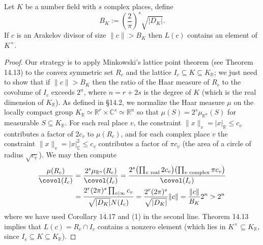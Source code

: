 \begin{proposition}[15.9]
Let $K$ be a number field with $s$ complex places, define
\[
B_K:=\left(\frac2\pi\right)^s\sqrt{|D_K|}.
\]
If $c$ is an Arakelov divisor of size $\|c\|>B_K$ then $L(c)$ contains an element of $K^\times$.
\end{proposition}
\begin{proof}
Our strategy is to apply Minkowski's lattice point theorem (see Theorem 14.13) to the convex symmetric set $R_c$ and the lattice $I_c\subseteq K\subseteq K_{\mathbb R}$; we just need to show that if $\|c\|>B_K$ then the ratio of the Haar measure of $R_c$ to the covolume of $I_c$ exceeds $2^n$, where $n=r+2s$ is the degree of $K$ (which is the real dimension of $K_{\mathbb R}$). As defined in \S14.2, we normalize the Haar measure $\mu$ on the locally compact group $K_{\mathbb R}\simeq\mathbb R^r\times\mathbb C^s\simeq\mathbb R^n$ so that $\mu(S)=2^s\mu_{\mathbb R^n}(S)$ for measurable $S\subseteq K_{\mathbb R}$. For each real place $v$, the constraint $\|x\|_v=|x|_{\mathbb R}\leq c_v$ contributes a factor of $2c_v$ to $\mu(R_c)$, and for each complex place $v$ the constraint $\|x\|_v=|x|_{\mathbb C}^2\leq c_v$ contributes a factor of $\pi c_v$ (the area of a circle of radius $\sqrt{c_v}$). We may then compute
\begin{align*}
\frac{\mu(R_c)}{\covol(I_c)}
&=\frac{2^s\mu_{\mathbb R^n}(R_c)}{\covol(I_c)}
=\frac{2^s\bigl(\prod_{v\text{ real}}2c_v\bigr)\bigl(\prod_{v\text{ complex}}\pi c_v\bigr)}{\covol(I_c)}\\
&=\frac{2^r(2\pi)^s\prod_{v\mid\infty}c_v}{\sqrt{|D_K|}N(I_c)}
=\frac{2^r(2\pi)^s}{\sqrt{|D_K|}}\|c\|
=\frac{\|c\|}{B_K}2^n>2^n
\end{align*}
where we have used Corollary 14.17 and (1) in the second line. Theorem 14.13 implies that $L(c)=R_c\cap I_c$ contains a nonzero element (which lies in $K^\times\subseteq K_{\mathbb R}$, since $I_c\subseteq K\subseteq K_{\mathbb R}$).
\end{proof}

